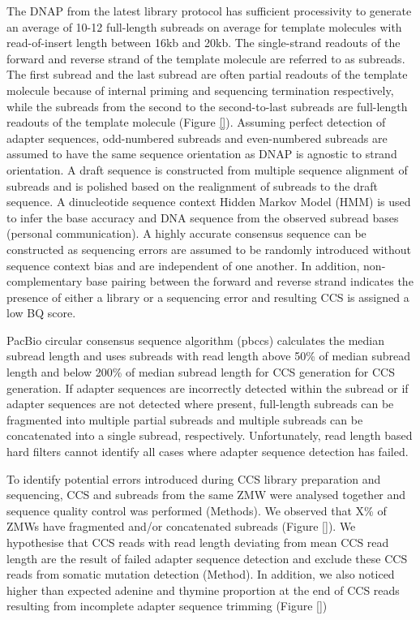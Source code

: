 The DNAP from the latest library protocol has sufficient processivity to generate an average of 10-12 full-length subreads on average for template molecules with read-of-insert length between 16kb and 20kb. The single-strand readouts of the forward and reverse strand of the template molecule are referred to as subreads. The first subread and the last subread are often partial readouts of the template molecule because of internal priming and sequencing termination respectively, while the subreads from the second to the second-to-last subreads are full-length readouts of the template molecule (Figure \ref{}).  Assuming perfect detection of adapter sequences, odd-numbered subreads and even-numbered subreads are assumed to have the same sequence orientation as DNAP is agnostic to strand orientation. A draft sequence is constructed from multiple sequence alignment of subreads and is polished based on the realignment of subreads to the draft sequence. A dinucleotide sequence context Hidden Markov Model (HMM) is used to infer the base accuracy and DNA sequence from the observed subread bases (personal communication). A highly accurate consensus sequence can be constructed as sequencing errors are assumed to be randomly introduced without sequence context bias and are independent of one another. In addition, non-complementary base pairing between the forward and reverse strand indicates the presence of either a library or a sequencing error and resulting CCS is assigned a low BQ score. 

PacBio circular consensus sequence algorithm (pbccs) calculates the median subread length and uses subreads with read length above 50\% of median subread length and below 200\% of median subread length for CCS generation for CCS generation. If adapter sequences are incorrectly detected within the subread or if adapter sequences are not detected where present, full-length subreads can be fragmented into multiple partial subreads and multiple subreads can be concatenated into a single subread, respectively. Unfortunately, read length based hard filters cannot identify all cases where adapter sequence detection has failed. 

To identify potential errors introduced during CCS library preparation and sequencing, CCS and subreads from the same ZMW were analysed together and sequence quality control was performed (Methods). We observed that X\% of ZMWs have fragmented and/or concatenated subreads (Figure \ref{}). We hypothesise that CCS reads with read length deviating from mean CCS read length are the result of failed adapter sequence detection and exclude these CCS reads from somatic mutation detection (Method). In addition, we also noticed higher than expected adenine and thymine proportion at the end of CCS reads resulting from incomplete adapter sequence trimming (Figure \ref{}) 

